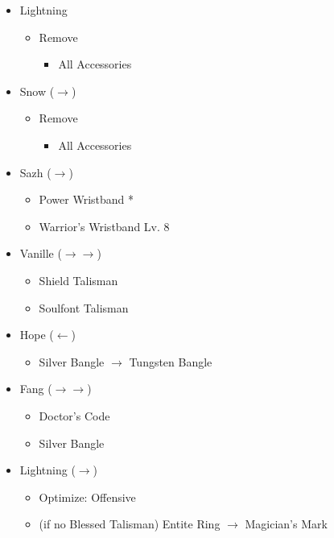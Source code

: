 \begin{menu}
\begin{multicols}{2}
\begin{itemize}
    \equip
    \begin{itemize}
        \item Lightning
        \begin{itemize}
            \item Remove
            \begin{itemize}
                \item All Accessories
            \end{itemize}
        \end{itemize}
        \item Snow ($\rightarrow$)
            \begin{itemize}
                \item Remove
		\begin{itemize}
                \item All Accessories
            \end{itemize}
            \end{itemize}
        \item Sazh ($\rightarrow$)
        \begin{itemize}
                \item Power Wristband *
                \item Warrior's Wristband Lv. 8
            \end{itemize}
        \columnbreak
        \item Vanille ($\rightarrow\rightarrow$)
        \begin{itemize}
                \item Shield Talisman
                \item Soulfont Talisman
        \end{itemize}
        \item Hope ($\leftarrow$)
            \begin{itemize}
                \item Silver Bangle $\rightarrow$ Tungsten Bangle
            \end{itemize}
        \item Fang ($\rightarrow\rightarrow$)
            \begin{itemize}
                \item Doctor's Code
                \item Silver Bangle
        \end{itemize}
        \item Lightning ($\rightarrow$)
        \begin{itemize}
                \item Optimize: Offensive
                \item (if no Blessed Talisman) Entite Ring $\rightarrow$ Magician's Mark
        \end{itemize}
    \end{itemize}
\end{itemize}
\end{multicols}
\end{menu}

